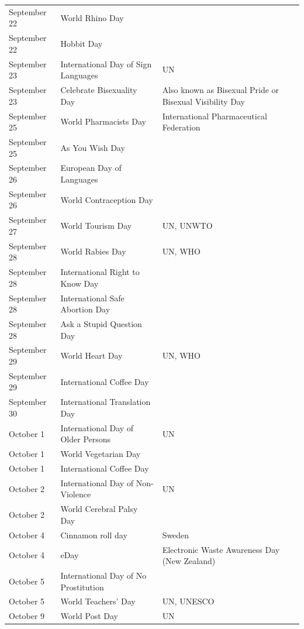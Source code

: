 \documentclass[
  openany]{book}
\begin{document}
\begin{longtable}[t]{>{\raggedright\arraybackslash}p{8em}>{\raggedright\arraybackslash}p{18em}>{\raggedright\arraybackslash}p{10em}}
September 22 & World Rhino Day & \\
\rowcolor{gray!6}  September 22 & Hobbit Day & \\
September 23 & International Day of Sign Languages & UN\\
\rowcolor{gray!6}  September 23 & Celebrate Bisexuality Day & Also known as Bisexual Pride or Bisexual Visibility Day\\
\addlinespace
September 25 & World Pharmacists Day & International Pharmaceutical Federation\\
\rowcolor{gray!6}  September 25 & As You Wish Day & \\
September 26 & European Day of Languages & \\
\rowcolor{gray!6}  September 26 & World Contraception Day & \\
September 27 & World Tourism Day & UN, UNWTO\\
\addlinespace
\rowcolor{gray!6}  September 28 & World Rabies Day & UN, WHO\\
September 28 & International Right to Know Day & \\
\rowcolor{gray!6}  September 28 & International Safe Abortion Day & \\
September 28 & Ask a Stupid Question Day & \\
\rowcolor{gray!6}  September 29 & World Heart Day & UN, WHO\\
\addlinespace
September 29 & International Coffee Day & \\
\rowcolor{gray!6}  September 30 & International Translation Day & \\
October 1 & International Day of Older Persons & UN\\
\rowcolor{gray!6}  October 1 & World Vegetarian Day & \\
October 1 & International Coffee Day & \\
\addlinespace
\rowcolor{gray!6}  October 2 & International Day of Non-Violence & UN\\
October 2 & World Cerebral Palsy Day & \\
\rowcolor{gray!6}  October 4 & Cinnamon roll day & Sweden\\
October 4 & eDay & Electronic Waste Awareness Day (New Zealand)\\
\rowcolor{gray!6}  October 5 & International Day of No Prostitution & \\
\addlinespace
October 5 & World Teachers' Day & UN, UNESCO\\
\rowcolor{gray!6}  October 9 & World Post Day & UN\\

\end{longtable}
\end{document}
